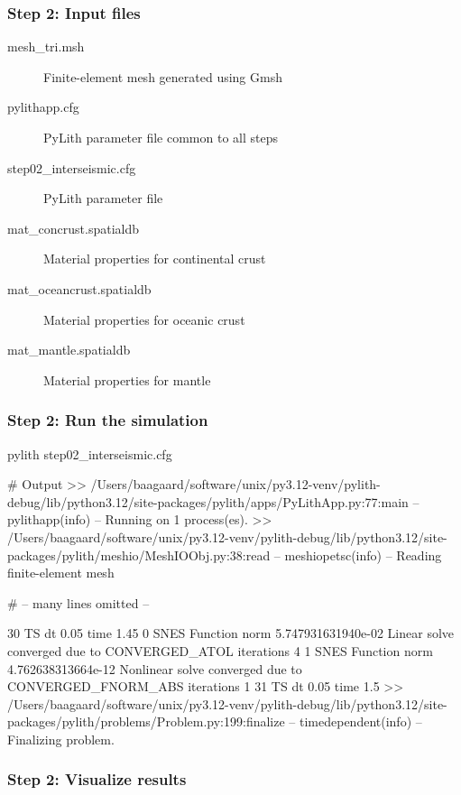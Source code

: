 \documentclass[aspectratio=169]{beamer}
\begin{document}
\begin{frame}
  \frametitle{Step 2: Input files}
  \summary{}

  \begin{description}
  \item[mesh\_tri.msh] Finite-element mesh generated using Gmsh
  \item[pylithapp.cfg] PyLith parameter file common to all steps
  \item[step02\_interseismic.cfg] PyLith parameter file
  \item[mat\_concrust.spatialdb] Material properties for continental crust
  \item[mat\_oceancrust.spatialdb] Material properties for oceanic crust
  \item[mat\_mantle.spatialdb] Material properties for mantle
  \end{description}
    
\end{frame}


\begin{frame}[fragile]
  \frametitle{Step 2: Run the simulation}
  \summary{}

\begin{bashcode}
pylith step02_interseismic.cfg

# Output
 >> /Users/baagaard/software/unix/py3.12-venv/pylith-debug/lib/python3.12/site-packages/pylith/apps/PyLithApp.py:77:main
 -- pylithapp(info)
 -- Running on 1 process(es).
 >> /Users/baagaard/software/unix/py3.12-venv/pylith-debug/lib/python3.12/site-packages/pylith/meshio/MeshIOObj.py:38:read
 -- meshiopetsc(info)
 -- Reading finite-element mesh

# -- many lines omitted --

30 TS dt 0.05 time 1.45
    0 SNES Function norm 5.747931631940e-02
      Linear solve converged due to CONVERGED_ATOL iterations 4
    1 SNES Function norm 4.762638313664e-12
    Nonlinear solve converged due to CONVERGED_FNORM_ABS iterations 1
31 TS dt 0.05 time 1.5
 >> /Users/baagaard/software/unix/py3.12-venv/pylith-debug/lib/python3.12/site-packages/pylith/problems/Problem.py:199:finalize
 -- timedependent(info)
 -- Finalizing problem.
\end{bashcode}
  
\end{frame}


\begin{frame}
  \frametitle{Step 2: Visualize results}

    
\end{frame}
\end{document}
